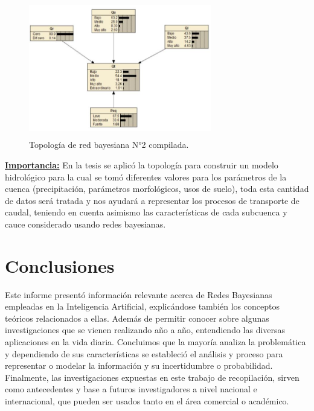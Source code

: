 \documentclass[10pt,conference]{IEEEtran}
\begin{document}
\begin{enumerate}
\begin{figure}[H]
\begin{center}
\includegraphics[width=8cm, height=6cm]{figuras/R35.JPG}
\caption{Topología de red bayesiana N°2 compilada.}
\label{R35} 
\end{center}
\end{figure}

\textbf{\underline{Importancia:}}
En la tesis se aplicó la topología para construir un modelo hidrológico para la cual se tomó diferentes valores para los parámetros de la cuenca (precipitación, parámetros morfológicos, usos de suelo), toda esta cantidad de datos
será tratada y nos ayudará a representar los procesos de transporte de caudal, teniendo
en cuenta asimismo las características de cada subcuenca y cauce considerado usando redes bayesianas.\par
\end{enumerate} 
\section{\textbf{Conclusiones}}
Este informe presentó información relevante acerca de Redes Bayesianas empleadas en la Inteligencia Artificial, explicándose también los conceptos teóricos relacionados a ellas. Además de permitir conocer sobre algunas investigaciones que se vienen realizando año a año, entendiendo las diversas aplicaciones en la vida diaria. Concluimos que la mayoría analiza la problemática y dependiendo de sus características se estableció el análisis y proceso para representar o modelar la información y su incertidumbre o probabilidad. Finalmente, las investigaciones expuestas en este trabajo de recopilación, sirven como antecedentes y base a futuros investigadores a nivel nacional e internacional, que pueden ser usados tanto en el área comercial o académico.
\medskip

\end{document}
